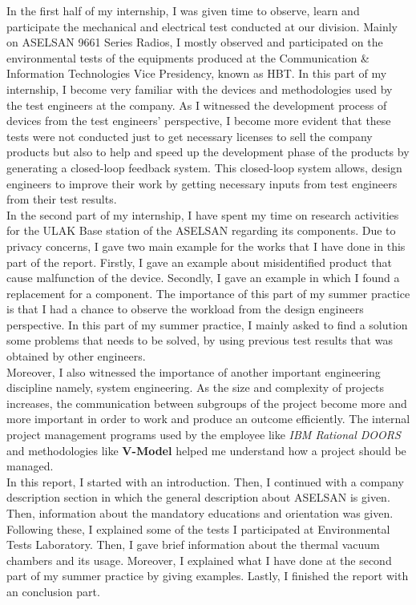 	In the first half of my internship, I was given time to observe, learn and participate the mechanical and electrical test conducted at our division. Mainly on ASELSAN 9661 Series Radios, I mostly observed and participated on the environmental tests of the equipments produced at the Communication \& Information Technologies Vice Presidency, known as HBT. In this part of my internship, I become very familiar with the devices and methodologies used by the test engineers at the company. As I witnessed the development process of devices from the test engineers' perspective, I become more evident that these tests were not conducted just to get necessary licenses to sell the company products but also to help and speed up the development phase of the products by generating a closed-loop feedback system. This closed-loop system allows, design engineers to improve their work by getting necessary inputs from test engineers from their test results.\\
	

	In the second part of my internship, I have spent my time on research activities for the ULAK Base station of the ASELSAN regarding its components. Due to privacy concerns, I gave two main example for the works that I have done in this part of the report. Firstly, I gave an example about misidentified product that cause malfunction of the device. Secondly, I gave an example in which I found a replacement for a component. The importance of this part of my summer practice is that I had a chance to observe the workload from the design engineers perspective. In this part of my summer practice, I mainly asked to find a solution some problems that needs to be solved, by using previous test results that was obtained by other engineers. \\
	 
	Moreover, I also witnessed the importance of another important engineering discipline namely, system engineering. As the size and complexity of projects increases, the communication between subgroups of the project become more and more important in order to work and produce an outcome efficiently. The internal project management programs used by the employee like \textit{IBM Rational DOORS} and methodologies like \textbf{V-Model} helped me understand how a project should be managed. \\
	
	In this report, I started with an introduction. Then, I continued with a company description section in which the general description about ASELSAN is given. Then, information about the mandatory educations and orientation was given. Following these, I explained some of the tests I participated at Environmental Tests Laboratory. Then, I gave brief information about the thermal vacuum chambers and its usage. Moreover, I explained what I have done at the second part of my summer practice by giving examples. Lastly, I finished the report with an conclusion part. \\
			

